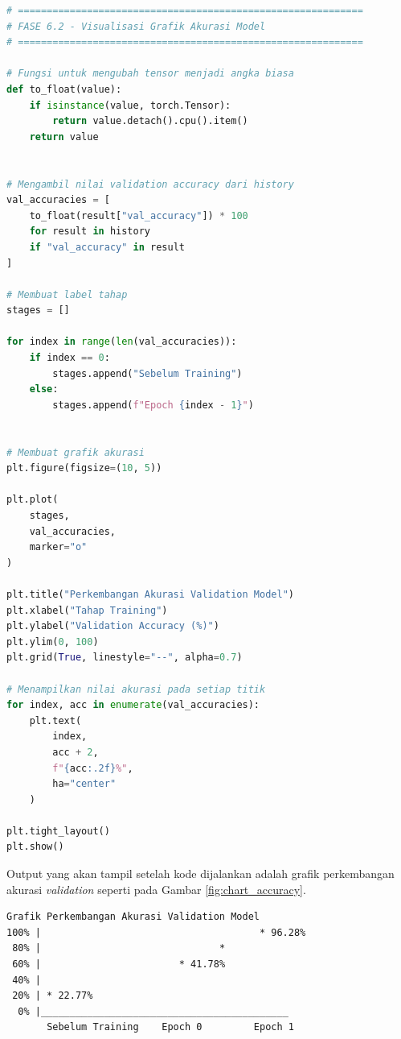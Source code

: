 \begin{lstlisting}[language=Python, caption=Visualisasi grafik akurasi model]
# ============================================================
# FASE 6.2 - Visualisasi Grafik Akurasi Model
# ============================================================

# Fungsi untuk mengubah tensor menjadi angka biasa
def to_float(value):
    if isinstance(value, torch.Tensor):
        return value.detach().cpu().item()
    return value


# Mengambil nilai validation accuracy dari history
val_accuracies = [
    to_float(result["val_accuracy"]) * 100
    for result in history
    if "val_accuracy" in result
]

# Membuat label tahap
stages = []

for index in range(len(val_accuracies)):
    if index == 0:
        stages.append("Sebelum Training")
    else:
        stages.append(f"Epoch {index - 1}")


# Membuat grafik akurasi
plt.figure(figsize=(10, 5))

plt.plot(
    stages,
    val_accuracies,
    marker="o"
)

plt.title("Perkembangan Akurasi Validation Model")
plt.xlabel("Tahap Training")
plt.ylabel("Validation Accuracy (%)")
plt.ylim(0, 100)
plt.grid(True, linestyle="--", alpha=0.7)

# Menampilkan nilai akurasi pada setiap titik
for index, acc in enumerate(val_accuracies):
    plt.text(
        index,
        acc + 2,
        f"{acc:.2f}%",
        ha="center"
    )

plt.tight_layout()
plt.show()
\end{lstlisting}

Output yang akan tampil setelah kode dijalankan adalah grafik perkembangan akurasi \textit{validation} seperti pada Gambar \ref{fig:chart_accuracy}.


\begin{outputcode}[H]
\begin{lstlisting}[language={}]
Grafik Perkembangan Akurasi Validation Model
100% |                                      * 96.28%
 80% |                               *
 60% |                        * 41.78%
 40% |
 20% | * 22.77%
  0% |___________________________________________
       Sebelum Training    Epoch 0         Epoch 1
\end{lstlisting}
\caption{Ilustrasi grafik perkembangan akurasi validation model}
\label{fig:chart_accuracy}
\end{outputcode}

